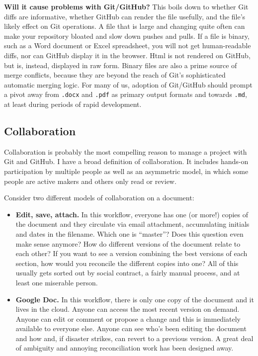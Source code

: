 \documentclass[12pt]{article}
\begin{document}
\textbf{Will it cause problems with Git/GitHub?} This boils down to
whether Git diffs are informative, whether GitHub can render the file
usefully, and the file's likely effect on Git operations. A file that is
large and changing quite often can make your repository bloated and slow
down pushes and pulls. If a file is binary, such as a Word document or
Excel spreadsheet, you will not get human-readable diffs, nor can GitHub
display it in the browser. Html is not rendered on GitHub, but is,
instead, displayed in raw form. Binary files are also a prime source of
merge conflicts, because they are beyond the reach of Git's
sophisticated automatic merging logic. For many of us, adoption of
Git/GitHub should prompt a pivot away from \texttt{.docx} and
\texttt{.pdf} as primary output formats and towards \texttt{.md}, at
least during periods of rapid development.

\subsection{Collaboration}\label{collaboration}

Collaboration is probably the most compelling reason to manage a project
with Git and GitHub. I have a broad definition of collaboration. It
includes hands-on participation by multiple people as well as an
asymmetric model, in which some people are active makers and others only
read or review.

Consider two different models of collaboration on a document:

\begin{itemize}
\item
  \textbf{Edit, save, attach.} In this workflow, everyone has one (or
  more!) copies of the document and they circulate via email attachment,
  accumulating initials and dates in the filename. Which one is
  ``master''? Does this question even make sense anymore? How do
  different versions of the document relate to each other? If you want
  to see a version combining the best versions of each section, how
  would you reconcile the different copies into one? All of this usually
  gets sorted out by social contract, a fairly manual process, and at
  least one miserable person.
\item
  \textbf{Google Doc.} In this workflow, there is only one copy of the
  document and it lives in the cloud. Anyone can access the most recent
  version on demand. Anyone can edit or comment or propose a change and
  this is immediately available to everyone else. Anyone can see who's
  been editing the document and how and, if disaster strikes, can revert
  to a previous version. A great deal of ambiguity and annoying
  reconciliation work has been designed away.
\end{itemize}
\end{document}
